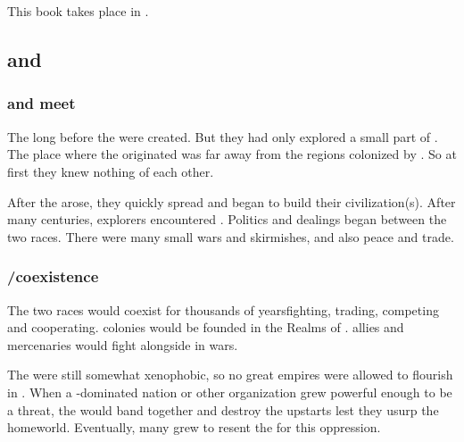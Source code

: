 \chapter{\MerkyrahBook}
This book takes place in . 













\section{\Resphain and \Ophidians}









\subsection{\Ophidians and \resphain meet}
The \ophidians {} long before the \resphain were created.
But they had only explored a small part of \Nyx.
The place where the \resphain originated was far away from the regions colonized by \ophidians.
So at first they knew nothing of each other. 

After the \resphain arose, they quickly spread and began to build their civilization(s). 
After many centuries, \resphan explorers encountered \ophidians. 
Politics and dealings began between the two races. 
There were many small wars and skirmishes, and also peace and trade. 









\subsection{\Ophidian/\resphan coexistence}
The two races would coexist for thousands of years\dash fighting, trading, competing and cooperating. 
\Resphan colonies would be founded in the Realms of \Azmith. 
\Resphan allies and mercenaries would fight alongside \ophidians in \ophidian wars. 

The \ophidians were still somewhat xenophobic, so no great \resphan empires were allowed to flourish in \Azmith.
When a \resphan-dominated nation or other organization grew powerful enough to be a threat, the \ophidians would band together and destroy the \resphan upstarts lest they usurp the \ophidian homeworld. 
Eventually, many \resphain grew to resent the \ophidians for this oppression. 





